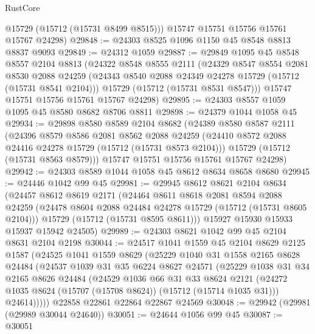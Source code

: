 \begin{lexlean}{RustCore}
\begin{coremodule}
        @15729
        (@15712 (@15731 @8499 @8515)))
      @15747
      @15751
      @15756
      @15761
      @15767
      @24298)
@29848 := @24303 @8525 @1096 @1150 @45 @8548 @8813 @8837 @9093
@29849 := @24312 @1059
@29887 := @29849
    @1095
    @45
    @8548
    @8557
    @2104
    @8813
    (@24322
      @8548
      @8555
      @2111
      (@24329
        @8547
        @8554
        @2081
        @8530
        @2088
        @24259
        (@24343 @8540 @2088 @24349 @24278 @15729 (@15712 (@15731 @8541 @2104)))
        @15729
        (@15712 (@15731 @8531 @8547)))
      @15747
      @15751
      @15756
      @15761
      @15767
      @24298)
@29895 := @24303 @8557 @1059 @1095 @45 @8580 @8682 @8706 @8811
@29898 := @24379 @1044 @1058 @45
@29934 := @29898
    @8580
    @8589
    @2104
    @8682
    (@24389
      @8580
      @8587
      @2111
      (@24396
        @8579
        @8586
        @2081
        @8562
        @2088
        @24259
        (@24410 @8572 @2088 @24416 @24278 @15729 (@15712 (@15731 @8573 @2104)))
        @15729
        (@15712 (@15731 @8563 @8579)))
      @15747
      @15751
      @15756
      @15761
      @15767
      @24298)
@29942 := @24303 @8589 @1044 @1058 @45 @8612 @8634 @8658 @8680
@29945 := @24446 @1042 @99 @45
@29981 := @29945
    @8612
    @8621
    @2104
    @8634
    (@24457
      @8612
      @8619
      @2171
      (@24464
        @8611
        @8618
        @2081
        @8594
        @2088
        @24259
        (@24478 @8604 @2088 @24484 @24278 @15729 (@15712 (@15731 @8605 @2104)))
        @15729
        (@15712 (@15731 @8595 @8611)))
      @15927
      @15930
      @15933
      @15937
      @15942
      @24505)
@29989 := @24303 @8621 @1042 @99 @45 @2104 @8631 @2104 @2198
@30044 := @24517
    @1041
    @1559
    @45
    @2104
    @8629
    @2125
    @1587
    (@24525
      @1041
      @1559
      @8629
      (@25229
        @1040
        @31
        @1558
        @2165
        @8628
        @24484
        (@24537
          @1039
          @31
          @35
          @6224
          @8627
          @24571
          (@25229
            @1038
            @31
            @34
            @2165
            @8626
            @24484
            (@24529
              @1036
              @66
              @31
              @33
              @8624
              @2121
              (@24272 @1035 @8624 (@15707 (@15708 @8624)) (@15712 (@15714 @1035 @31)))
              @24614)))))
    @22858
    @22861
    @22864
    @22867
    @24569
@30048 := @29942 (@29981 (@29989 @30044 @24640))
@30051 := @24644 @1056 @99 @45
@30087 := @30051

\end{coremodule}
\end{lexlean}
